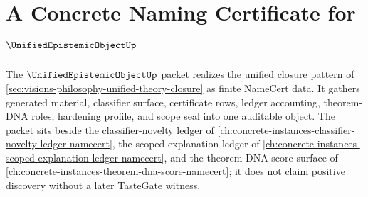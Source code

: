 \chapter{A Concrete Naming Certificate for $\UnifiedEpistemicObjectUp$}
\label{ch:concrete-instances-unified-epistemic-object-namecert}

The $\UnifiedEpistemicObjectUp$ packet realizes the unified closure pattern of \autoref{sec:visions-philosophy-unified-theory-closure} as finite NameCert data. It gathers generated material, classifier surface, certificate rows, ledger accounting, theorem-DNA roles, hardening profile, and scope seal into one auditable object. The packet sits beside the classifier-novelty ledger of \autoref{ch:concrete-instances-classifier-novelty-ledger-namecert}, the scoped explanation ledger of \autoref{ch:concrete-instances-scoped-explanation-ledger-namecert}, and the theorem-DNA score surface of \autoref{ch:concrete-instances-theorem-dna-score-namecert}; it does not claim positive discovery without a later TasteGate witness.

